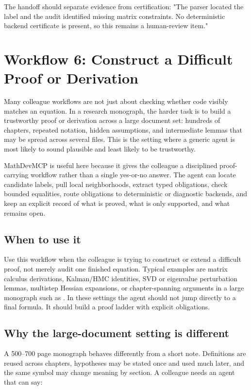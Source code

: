\documentclass[12pt,a4paper,openany]{book}
\begin{document}
The handoff should separate evidence from certification: "The parser located the
label and the audit identified missing matrix constraints. No deterministic
backend certificate is present, so this remains a human-review item."

\chapter{Workflow 6: Construct a Difficult Proof or Derivation}

Many colleague workflows are not just about checking whether code visibly matches
an equation. In a research monograph, the harder task is to build a trustworthy
proof or derivation across a large document set: hundreds of chapters, repeated
notation, hidden assumptions, and intermediate lemmas that may be spread across
several files. This is the setting where a generic agent is most likely to sound
plausible and least likely to be trustworthy.

MathDevMCP is useful here because it gives the colleague a disciplined
proof-carrying workflow rather than a single yes-or-no answer. The agent can
locate candidate labels, pull local neighborhoods, extract typed obligations,
check bounded equalities, route obligations to deterministic or diagnostic
backends, and keep an explicit record of what is proved, what is only supported,
and what remains open.

\section*{When to use it}

Use this workflow when the colleague is trying to construct or extend a difficult
proof, not merely audit one finished equation. Typical examples are matrix
calculus derivations, Kalman/HMC identities, SVD or eigenvalue perturbation
lemmas, multistep Hessian expansions, or chapter-spanning arguments in a large
monograph such as . In these settings the
agent should not jump directly to a final formula. It should build a proof ladder
with explicit obligations.

\section*{Why the large-document setting is different}

A 500--700 page monograph behaves differently from a short note.
Definitions are reused across chapters, hypotheses may be stated once and used
much later, and the same symbol may change meaning by section. A colleague needs
an agent that can say:
\end{document}
